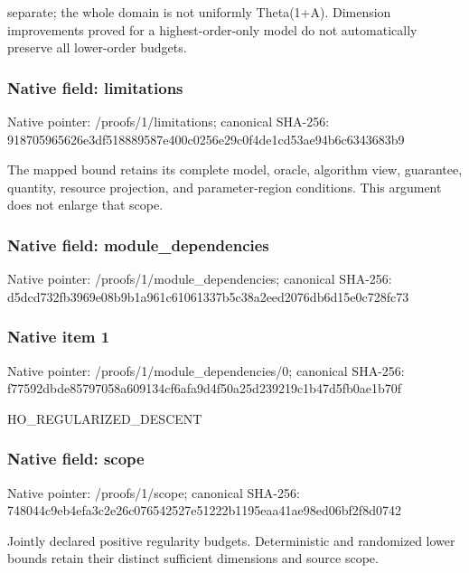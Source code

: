 \documentclass[10pt,a4paper]{article}
\begin{document}
separate;\allowbreak{} the whole domain is not uniformly Theta(1+A). Dimension improvements proved for a highest-order-only model do not automatically preserve all lower-order budgets.\par\endgroup

\subsubsection{Native field: limitations}
Native pointer: /proofs/1/limitations; canonical SHA-256: 918705965626e3df518889587e400c0256e29c0f4de1cd53ae94b6c6343683b9

\begingroup\raggedright\sloppy The mapped bound retains its complete model,\allowbreak{} oracle,\allowbreak{} algorithm view,\allowbreak{} guarantee,\allowbreak{} quantity,\allowbreak{} resource projection,\allowbreak{} and parameter-region conditions. This argument does not enlarge that scope.\par\endgroup

\subsubsection{Native field: module\_\allowbreak{}dependencies}
Native pointer: /proofs/1/module\_\allowbreak{}dependencies; canonical SHA-256: d5dcd732fb3969e08b9b1a961c61061337b5c38a2eed2076db6d15e0c728fc73

\subsubsection{Native item 1}
Native pointer: /proofs/1/module\_\allowbreak{}dependencies/0; canonical SHA-256: f77592dbde85797058a609134cf6afa9d4f50a25d239219c1b47d5fb0ae1b70f

\begingroup\raggedright\sloppy HO\_\allowbreak{}REGULARIZED\_\allowbreak{}DESCENT\par\endgroup

\subsubsection{Native field: scope}
Native pointer: /proofs/1/scope; canonical SHA-256: 748044c9eb4efa3c2e26c076542527e51222b1195eaa41ae98ed06bf2f8d0742

\begingroup\raggedright\sloppy Jointly declared positive regularity budgets. Deterministic and randomized lower bounds retain their distinct sufficient dimensions and source scope.\par\endgroup
\end{document}
